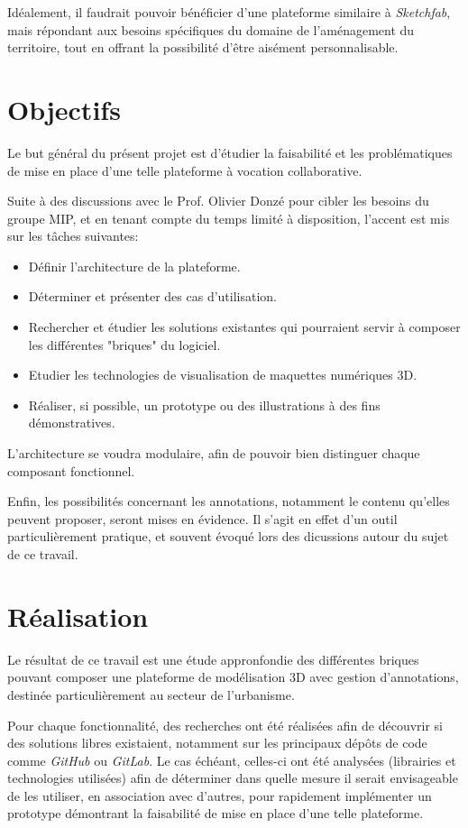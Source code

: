 Idéalement, il faudrait pouvoir bénéficier d'une plateforme similaire à \textit{Sketchfab}, mais répondant aux besoins spécifiques du domaine de l'aménagement du territoire, tout en offrant la possibilité d'être aisément personnalisable.

\section{Objectifs}

Le but général du présent projet est d'étudier la faisabilité et les problématiques de mise en place d'une telle plateforme à vocation collaborative.

Suite à des discussions avec le Prof. Olivier Donzé pour cibler les besoins du groupe MIP, et en tenant compte du temps limité à disposition, l'accent est mis sur les tâches suivantes:
\begin{itemize}
    \item Définir l'architecture de la plateforme.
    \item Déterminer et présenter des cas d'utilisation.
    \item Rechercher et étudier les solutions existantes qui pourraient servir à composer les différentes "briques" du logiciel.
    \item Etudier les technologies de visualisation de maquettes numériques 3D.
    \item Réaliser, si possible, un prototype ou des illustrations à des fins démonstratives.
\end{itemize}

L'architecture se voudra modulaire, afin de pouvoir bien distinguer chaque composant fonctionnel.

Enfin, les possibilités concernant les annotations, notamment le contenu qu'elles peuvent proposer, seront mises en évidence. 
Il s'agit en effet d'un outil particulièrement pratique, et souvent évoqué lors des dicussions autour du sujet de ce travail.

\section{Réalisation}

Le résultat de ce travail est une étude appronfondie des différentes briques pouvant composer une plateforme de modélisation 3D avec gestion d'annotations, destinée particulièrement au secteur de l'urbanisme.

Pour chaque fonctionnalité, des recherches ont été réalisées afin de découvrir si des solutions libres existaient, notamment sur les principaux dépôts de code comme \textit{GitHub} ou \textit{GitLab}. Le cas échéant, celles-ci ont été analysées (librairies et technologies utilisées) afin de déterminer dans quelle mesure il serait envisageable de les utiliser, en association avec d'autres, pour rapidement implémenter un prototype démontrant la faisabilité de mise en place d'une telle plateforme.

